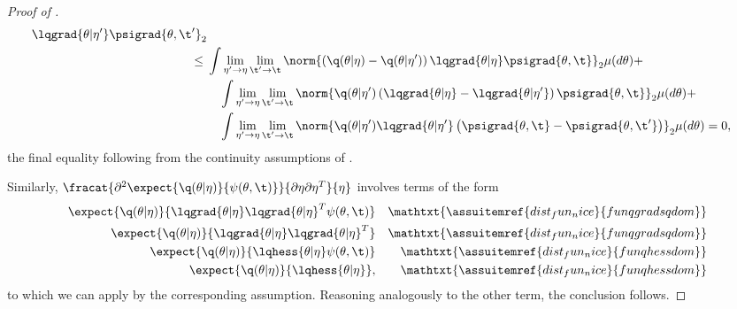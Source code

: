 \begin{proof}[Proof of ]
\begin{align*}
{          {\lqgrad{\theta \vert \eta'} \psigrad{\theta,\t'}}
      }_2 \\\le{}&
%
\int \lim_{\eta' \rightarrow \eta} \lim_{\t' \rightarrow \t} \norm{
\left(\q(\theta \vert \eta) - \q(\theta \vert \eta')\right)
    \lqgrad{\theta \vert \eta} \psigrad{\theta, \t}
}_2 \mu(d\theta) + \\&\quad
%
\int \lim_{\eta' \rightarrow \eta} \lim_{\t' \rightarrow \t} \norm{
\q(\theta \vert \eta')
    \left( \lqgrad{\theta \vert \eta} - \lqgrad{\theta \vert \eta'} \right)
    \psigrad{\theta, \t}
}_2 \mu(d\theta) + \\&\quad
%
\int \lim_{\eta' \rightarrow \eta} \lim_{\t' \rightarrow \t} \norm{
\q(\theta \vert \eta')\lqgrad{\theta \vert \eta'}
    \left( \psigrad{\theta, \t} - \psigrad{\theta, \t'} \right)
}_2 \mu(d\theta) = 0,
%
\end{align*}
%
the final equality following from the continuity assumptions of
.

Similarly, $\fracat{\partial^2
\expect{\q(\theta \vert \eta)} {\psi(\theta, \t)}}{\partial \eta \partial
\eta^T}{\eta}$ involves terms of the form
%
\begin{align*}
%
\expect{\q(\theta \vert \eta)}
       {\lqgrad{\theta \vert \eta} \lqgrad{\theta \vert \eta}^T
        \psi(\theta,\t)}
       && \mathtxt{\assuitemref{dist_fun_nice}{funqgradsqdom}} \\
\expect{\q(\theta \vert \eta)}
      {\lqgrad{\theta \vert \eta} \lqgrad{\theta \vert \eta}^T}
      && \mathtxt{\assuitemref{dist_fun_nice}{funqgradsqdom}} \\
%
\expect{\q(\theta \vert \eta)}
       {\lqhess{\theta \vert \eta}
        \psi(\theta,\t)}
       && \mathtxt{\assuitemref{dist_fun_nice}{funqhessdom}} \\
%
\expect{\q(\theta \vert \eta)}
       {\lqhess{\theta \vert \eta}},
       && \mathtxt{\assuitemref{dist_fun_nice}{funqhessdom}}
%
\end{align*}
%
to which we can apply  by the corresponding assumption.  Reasoning
analogously to the other term, the conclusion follows.
%
\end{proof}
%
